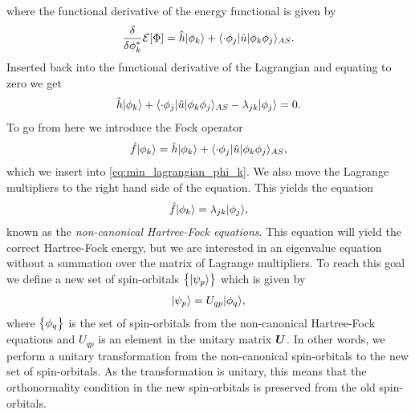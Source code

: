         where the functional derivative of the energy functional is given by
        \begin{align}
            \frac{\delta }{\delta \phi_k^{*}}\mathcal{E}[\Phi]
            = \hat{h}| \phi_k \rangle
            + \langle \cdot\phi_j |\hat{u}| \phi_k\phi_j \rangle_{AS}.
        \end{align}
        Inserted back into the functional derivative of the Lagrangian and
        equating to zero we get
        \begin{gather}
            \hat{h}| \phi_k \rangle
            + \langle \cdot\phi_j |\hat{u}| \phi_k\phi_j \rangle_{AS}
            - \lambda_{jk}| \phi_{j} \rangle = 0.
            \label{eq:min_lagrangian_phi_k}
        \end{gather}
        To go from here we introduce the Fock operator
        \begin{align}
            \hat{f}| \phi_k \rangle
            = \hat{h}| \phi_k \rangle
            + \langle \cdot\phi_j |\hat{u}| \phi_k\phi_j \rangle_{AS},
        \end{align}
        which we insert into \autoref{eq:min_lagrangian_phi_k}.
        We also move the Lagrange multipliers to the right hand side of the
        equation.
        This yields the equation
        \begin{align}
            \hat{f}| \phi_k \rangle = \lambda_{jk}| \phi_j \rangle,
            \label{eq:non-canonical-hartree-fock}
        \end{align}
        known as the \emph{non-canonical Hartree-Fock equations}.
        This equation will yield the correct Hartree-Fock energy, but we are
        interested in an eigenvalue equation without a summation over the matrix
        of Lagrange multipliers.
        To reach this goal we define a new set of spin-orbitals
        $\left\{ | \psi_p \rangle \right\}$ which is given by
        \begin{align}
            | \psi_p \rangle = U_{qp}| \phi_q \rangle,
        \end{align}
        where $\left\{ \phi_q \right\}$ is the set of spin-orbitals from the non-canonical
        Hartree-Fock equations and $U_{qp}$ is an element in the unitary matrix
        $\boldsymbol{U}$.
        In other words, we perform a unitary transformation from the
        non-canonical spin-orbitals to the new set of spin-orbitals.
        As the transformation is unitary, this means that the orthonormality
        condition in the new spin-orbitals is preserved from the old
        spin-orbitals.
